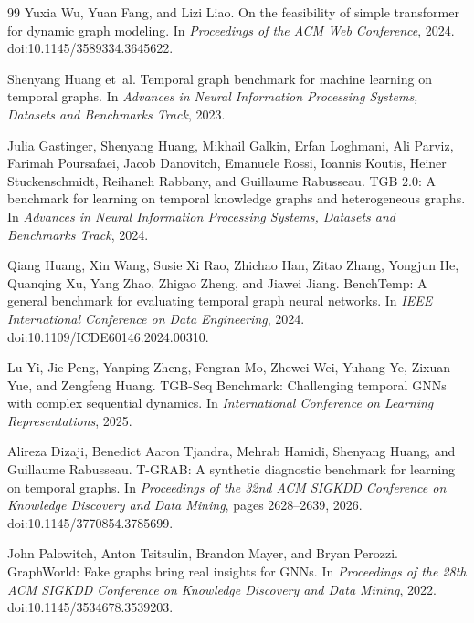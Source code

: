 \begin{thebibliography}{99}
Yuxia Wu, Yuan Fang, and Lizi Liao.
\newblock On the feasibility of simple transformer for dynamic graph modeling.
\newblock In \emph{Proceedings of the ACM Web Conference}, 2024.
\newblock doi:10.1145/3589334.3645622.

Shenyang Huang et~al.
\newblock Temporal graph benchmark for machine learning on temporal graphs.
\newblock In \emph{Advances in Neural Information Processing Systems, Datasets and Benchmarks Track}, 2023.

Julia Gastinger, Shenyang Huang, Mikhail Galkin, Erfan Loghmani, Ali Parviz, Farimah Poursafaei, Jacob Danovitch, Emanuele Rossi, Ioannis Koutis, Heiner Stuckenschmidt, Reihaneh Rabbany, and Guillaume Rabusseau.
\newblock TGB 2.0: A benchmark for learning on temporal knowledge graphs and heterogeneous graphs.
\newblock In \emph{Advances in Neural Information Processing Systems, Datasets and Benchmarks Track}, 2024.

Qiang Huang, Xin Wang, Susie Xi Rao, Zhichao Han, Zitao Zhang, Yongjun He, Quanqing Xu, Yang Zhao, Zhigao Zheng, and Jiawei Jiang.
\newblock BenchTemp: A general benchmark for evaluating temporal graph neural networks.
\newblock In \emph{IEEE International Conference on Data Engineering}, 2024.
\newblock doi:10.1109/ICDE60146.2024.00310.

Lu Yi, Jie Peng, Yanping Zheng, Fengran Mo, Zhewei Wei, Yuhang Ye, Zixuan Yue, and Zengfeng Huang.
\newblock TGB-Seq Benchmark: Challenging temporal GNNs with complex sequential dynamics.
\newblock In \emph{International Conference on Learning Representations}, 2025.

Alireza Dizaji, Benedict Aaron Tjandra, Mehrab Hamidi, Shenyang Huang, and Guillaume Rabusseau.
\newblock T-GRAB: A synthetic diagnostic benchmark for learning on temporal graphs.
\newblock In \emph{Proceedings of the 32nd ACM SIGKDD Conference on Knowledge Discovery and Data Mining}, pages 2628--2639, 2026.
\newblock doi:10.1145/3770854.3785699.

John Palowitch, Anton Tsitsulin, Brandon Mayer, and Bryan Perozzi.
\newblock GraphWorld: Fake graphs bring real insights for GNNs.
\newblock In \emph{Proceedings of the 28th ACM SIGKDD Conference on Knowledge Discovery and Data Mining}, 2022.
\newblock doi:10.1145/3534678.3539203.


\end{thebibliography}
